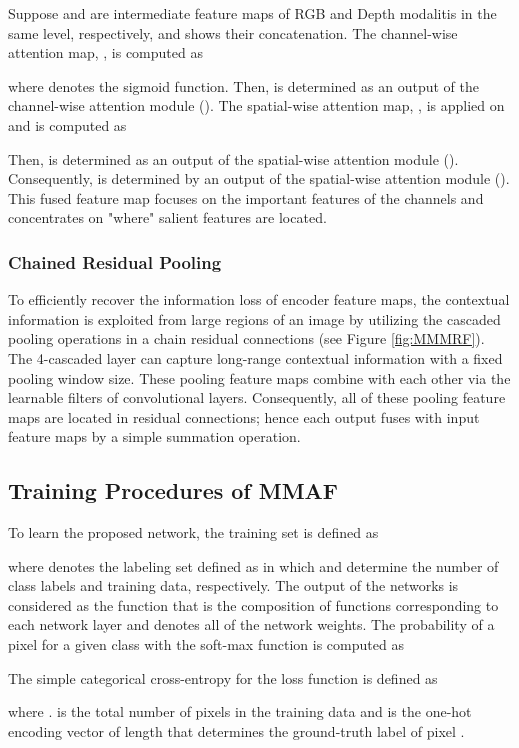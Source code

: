 \documentclass[journal,transmag]{IEEEtran}
\begin{document}
Suppose  and  are intermediate feature maps of RGB and Depth modalitis in the same level, respectively, and  shows their concatenation. The channel-wise attention map, , is computed as



where  denotes the sigmoid function. Then,  is determined as an output of the channel-wise attention module (). The spatial-wise attention map, , is applied on  and is  computed as



Then,  is determined as an output of the spatial-wise attention module ().
Consequently,  is determined by an output of the spatial-wise attention module ().  This fused feature map focuses on the important features of the channels and concentrates on "where" salient features are located.

\subsubsection{Chained Residual Pooling}
To efficiently recover the information loss of encoder feature maps, the contextual information is exploited from large regions of an image by utilizing the cascaded pooling operations in a chain residual connections (see Figure \ref{fig:MMMRF}). The 4-cascaded  layer can capture long-range contextual information with a fixed pooling window size. These pooling feature maps combine with each other via the learnable  filters of convolutional layers. Consequently, all of these pooling feature maps are located in residual connections; hence each output fuses with input feature maps by a simple summation operation. 
\subsection{Training Procedures of MMAF}
To learn the proposed network, the training set is defined as

where  denotes the labeling set defined as  in which  and  determine the number of class labels and training data, respectively. The output of the networks is considered as the function  that is the composition of functions corresponding to each network layer and  denotes all of the network weights. The probability of a pixel  for a given class  with the soft-max function is computed as 



The simple categorical cross-entropy for the loss function is defined as


where .   is the total number of pixels in the training data and  is the one-hot encoding vector of length  that determines the ground-truth label of pixel . 
\end{document}
